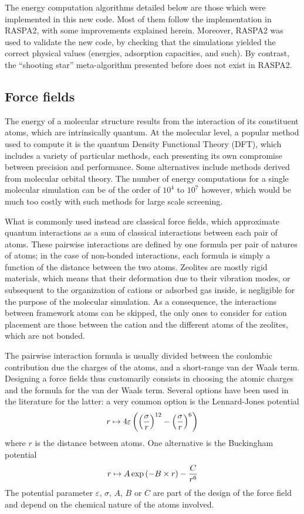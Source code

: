 \documentclass[main.tex]{subfiles}
\begin{document}
The energy computation algorithms detailed below are those which were implemented in this new code. Most of them follow the implementation in RASPA2, with some improvements explained herein. Moreover, RASPA2 was used to validate the new code, by checking that the simulations yielded the correct physical values (energies, adsorption capacities, and such). By contrast, the ``shooting star'' meta-algorithm presented before does not exist in RASPA2.

\subsection{Force fields}

\label{forcefields}

The energy of a molecular structure results from the interaction of its constituent atoms, which are intrinsically quantum. At the molecular level, a popular method used to compute it is the quantum Density Functional Theory (DFT), which includes a variety of particular methods, each presenting its own compromise between precision and performance. Some alternatives include methods derived from molecular orbital theory. The number of energy computations for a single molecular simulation can be of the order of $10^4$ to $10^7$ however, which would be much too costly with such methods for large scale screening.

What is commonly used instead are classical force fields, which approximate quantum interactions as a sum of classical interactions between each pair of atoms. These pairwise interactions are defined by one formula per pair of natures of atoms; in the case of non-bonded interactions, each formula is simply a function of the distance between the two atoms. Zeolites are mostly rigid materials, which means that their deformation due to their vibration modes, or subsequent to the organization of cations or adsorbed gas inside, is negligible for the purpose of the molecular simulation. As a consequence, the interactions between framework atoms can be skipped, the only ones to consider for cation placement are those between the cation and the different atoms of the zeolites, which are not bonded.

The pairwise interaction formula is usually divided between the coulombic contribution due the charges of the atoms, and a short-range van der Waals term. Designing a force fields thus customarily consists in choosing the atomic charges and the formula for the van der Waals term. Several options have been used in the literature for the latter: a very common option is the Lennard-Jones potential
\[r\mapsto 4\varepsilon\left(\left(\frac \sigma r\right)^{12} - \left(\frac \sigma r\right)^6\right)\label{eq:LJ}\]
where $r$ is the distance between atoms. One alternative is the Buckingham potential
\[r\mapsto A\exp\left(-B\times r\right) - \frac C{r^6}\label{eq:Buckingham}\]
The potential parameter $\varepsilon$, $\sigma$, $A$, $B$ or $C$ are part of the design of the force field and depend on the chemical nature of the atoms involved.
\end{document}
